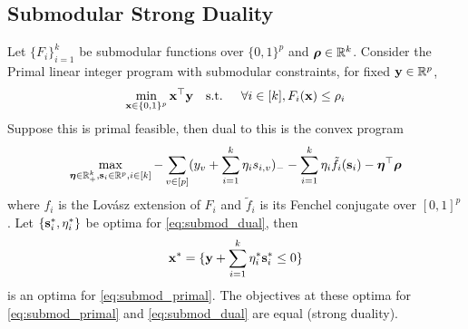 \subsection{Submodular Strong Duality}

\begin{lemma}
\label{lem:submod_convex}
Let $\{F_i\}_{i = 1}^k$ be submodular functions over $\{0,1\}^p$ and $\bm{\rho} \in \mathbb{R}^k$.
Consider the Primal linear integer program with submodular constraints, for fixed $\mathbf{y} \in \mathbb{R}^p$,
\begin{equation}
\label{eq:submod_primal}
\min_{\mathbf{x} \in \{0,1\}^p}  \mathbf{x}^\top \mathbf{y} \textrm{\quad s.t. \quad} \forall i \in [k], F_i(\mathbf{x}) \le \rho_i
\end{equation}
Suppose this is primal feasible,
then dual to this is the convex program
\begin{equation}
\label{eq:submod_dual}
\max_{\bm{\eta} \in \mathbb{R}_+^k, \mathbf{s}_i \in \mathbb{R}^p, i \in [k]}  - \sum_{v \in [p]} (y_v + \sum_{i=1}^k \eta_i s_{i,v})_- - \sum_{i = 1}^k \eta_i \tilde f_i (\mathbf{s}_i) - \bm{\eta}^\top \bm{\rho}
\end{equation}
where $f_i$ is the Lov\'asz extension of $F_i$ and $\tilde f_i$ is its Fenchel conjugate over $[0,1]^p$.
Let $\{\mathbf{s}_i^*,\eta_i^*\}$ be optima for \eqref{eq:submod_dual}, then 
\[
\mathbf{x}^* = \{\mathbf{y} + \sum_{i=1}^k \eta^*_i \mathbf{s}^*_i \le 0\}
\]
is an optima for \eqref{eq:submod_primal}.
The objectives at these optima for \eqref{eq:submod_primal} and \eqref{eq:submod_dual} are equal (strong duality).
\end{lemma}

